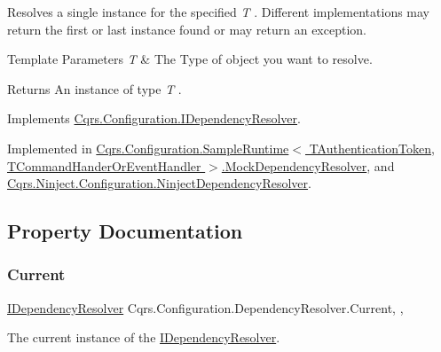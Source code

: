 Resolves a single instance for the specified {\itshape T} . Different implementations may return the first or last instance found or may return an exception. 


\begin{DoxyTemplParams}{Template Parameters}
{\em T} & The Type of object you want to resolve.\\
\hline
\end{DoxyTemplParams}
\begin{DoxyReturn}{Returns}
An instance of type {\itshape T} .
\end{DoxyReturn}


Implements \hyperlink{interfaceCqrs_1_1Configuration_1_1IDependencyResolver_a9dc7694a365209a5ef05270a7cfa7b6b_a9dc7694a365209a5ef05270a7cfa7b6b}{Cqrs.\+Configuration.\+I\+Dependency\+Resolver}.



Implemented in \hyperlink{classCqrs_1_1Configuration_1_1SampleRuntime_1_1MockDependencyResolver_a8f91ae00213bf65aa3349a7dcd82d24d_a8f91ae00213bf65aa3349a7dcd82d24d}{Cqrs.\+Configuration.\+Sample\+Runtime$<$ T\+Authentication\+Token, T\+Command\+Hander\+Or\+Event\+Handler $>$.\+Mock\+Dependency\+Resolver}, and \hyperlink{classCqrs_1_1Ninject_1_1Configuration_1_1NinjectDependencyResolver_ab044ba98051bdd3111e0c1be6259de10_ab044ba98051bdd3111e0c1be6259de10}{Cqrs.\+Ninject.\+Configuration.\+Ninject\+Dependency\+Resolver}.



\subsection{Property Documentation}
\mbox{\label{classCqrs_1_1Configuration_1_1DependencyResolver_aaede4bbd564000f2becf65e8be863fff_aaede4bbd564000f2becf65e8be863fff}} 
\subsubsection{\texorpdfstring{Current}{Current}}
{\footnotesize\ttfamily \hyperlink{interfaceCqrs_1_1Configuration_1_1IDependencyResolver}{I\+Dependency\+Resolver} Cqrs.\+Configuration.\+Dependency\+Resolver.\+Current\hspace{0.3cm}{\ttfamily [static]}, {\ttfamily [get]}, {}}



The current instance of the \hyperlink{interfaceCqrs_1_1Configuration_1_1IDependencyResolver}{I\+Dependency\+Resolver}. 

